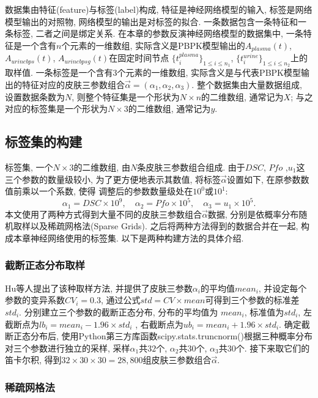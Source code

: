 \documentclass[a4paper,punct=banjiao,twoside]{ctexrep}
\theoremstyle{plain}
\theoremstyle{definition}
\theoremstyle{remark}
\begin{document}
数据集由特征(feature)与标签(label)构成, 特征是神经网络模型的输入, 标签是网络模型输出的对照物, 网络模型的输出是对标签的拟合. 一条数据包含一条特征和一条标签, 二者之间是绑定关系. 
在本章的参数反演神经网络模型的数据集中, 一条特征是一个含有$n$个元素的一维数组, 实际含义是PBPK模型输出的$A_{plasma}(t)$, $A_{urinebps}(t)$, $A_{urinebpsg}(t)$在固定时间节点
$\{t^{plasma}_{i}\}_{1 \leq i \leq n_1}$, $\{t^{urine}_{i}\}_{1 \leq i \leq n_2}$上的取样值. 一条标签是一个含有$3$个元素的一维数组, 实际含义是与代表PBPK模型输出的特征对应的皮肤三参数组合$\vec{\alpha} = (\alpha_1,\alpha_2,\alpha_3)$. 
整个数据集由大量数据组成, 设置数据条数为$N$, 则整个特征集是一个形状为$N \times n$的二维数组, 通常记为$X$; 与之对应的标签集是一个形状为$N \times 3$的二维数组, 通常记为$y$. 

\subsection{标签集的构建}
\label{3.2.1}
标签集, 一个$N \times 3$的二维数组, 由$N$条皮肤三参数组合组成. 由于$DSC$, $Pfo$ ,$u_1$这三个参数的数量级较小, 为了更方便地表示其数值, 将标签$\vec{\alpha}$设置如下, 在原参数数值前乘以一个系数, 使得
调整后的参数数量级处在$10^0$或$10^1$:
$$
  \alpha_1 = DSC \times 10^9, \quad
  \alpha_2 = Pfo \times 10^5, \quad
  \alpha_3 = u_1 \times 10^5.
$$
\noindent 本文使用了两种方式得到大量不同的皮肤三参数组合$\vec{\alpha}$数据, 分别是依概率分布随机取样以及稀疏网格法(Sparse Grids). 之后将两种方法得到的数据合并在一起, 构成本章神经网络使用的标签集.
以下是两种构建方法的具体介绍.

\subsubsection*{截断正态分布取样}
Hu等人\cite{11}提出了该种取样方法, 并提供了皮肤三参数$\alpha_i$的平均值$mean_i$, 并设定每个参数的变异系数$CV_i = 0.3$, 通过公式$std = CV\times mean$可得到三个参数的标准差$std_i$. 分别建立三个参数的截断正态分布, 分布的平均值为
$mean_i$, 标准值为$std_i$, 左截断点为$lb_i = mean_i - 1.96\times std_i$ , 右截断点为$ub_i = mean_i + 1.96\times std_i$. 确定截断正态分布后, 使用Python第三方库函数scipy.stats.truncnorm()根据三种概率分布
对三个参数进行独立的采样, 采样$\alpha_1$共$32$个, $\alpha_2$共$30$个, $\alpha_3$共$30$个. 接下来取它们的笛卡尔积, 得到$32 \times 30 \times 30 = 28,800$组皮肤三参数组合$\vec{\alpha}$. 

\subsubsection*{稀疏网格法}
\end{document}

